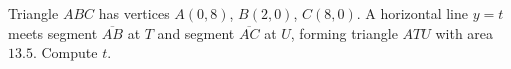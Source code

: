 Triangle $ABC$ has vertices $A(0,8)$, $B(2,0)$, $C(8,0)$. A horizontal line $y=t$ meets segment $\overline{AB}$ at $T$ and segment $\overline{AC}$ at $U$, forming triangle $ATU$ with area $13.5$. Compute $t$.
